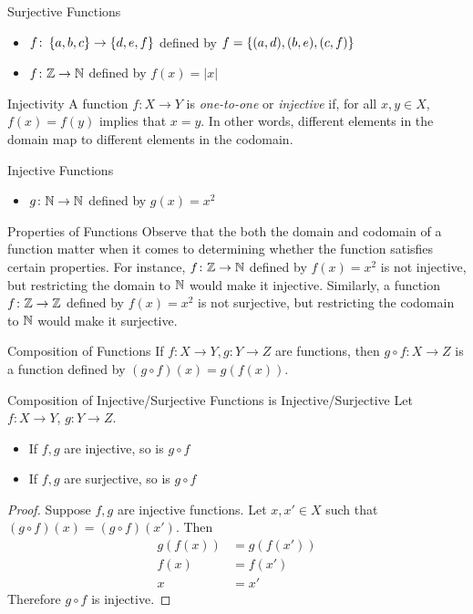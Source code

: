 \documentclass[class=article, crop=false]{standalone}
\begin{document}
  \begin{example}{Surjective Functions}
    \begin{itemize}
      \item $f\colon \left\{a, b, c\right\}\to \left\{d, e, f\right\}$ defined by $f = \left\{(a, d), (b, e), (c, f)\right\}$
      \item $f\colon \mathbb{Z}\to \mathbb{N}$ defined by $f(x) = |x|$
    \end{itemize}
  \end{example}
  \begin{definition}{Injectivity}
    A function $f\colon X\to Y$ is \emph{one-to-one} or \emph{injective} if, for all $x, y\in X$, $f(x) = f(y)$ implies that $x = y$. In other words, different elements in the domain map to different elements in the codomain.
  \end{definition}
  \begin{example}{Injective Functions}
    \begin{itemize}
      \item $g\colon \mathbb{N}\to \mathbb{N}$ defined by $g(x) = x^2$
    \end{itemize}
  \end{example}
  \begin{note}{Properties of Functions}
    Observe that the both the domain and codomain of a function matter when it comes to determining whether the function satisfies certain properties. For instance, $f\colon \mathbb{Z}\to \mathbb{N}$ defined by $f(x) = x^2$ is not injective, but restricting the domain to $\mathbb{N}$ would make it injective. Similarly, a function $f\colon \mathbb{Z}\to \mathbb{Z}$ defined by $f(x) = x^2$ is not surjective, but restricting the codomain to $\mathbb{N}$ would make it surjective.
  \end{note}
  \begin{definition}{Composition of Functions}
    If $f\colon X\to Y, g\colon Y\to Z$ are functions, then $g\circ f\colon X\to Z$ is a function defined by $(g\circ f)(x) = g(f(x))$.
  \end{definition}
  \newpage
  \begin{theorem}{Composition of Injective/Surjective Functions is Injective/Surjective}
    Let $f\colon X\to Y$, $g\colon Y\to Z$.
    \begin{itemize}
      \item If $f, g$ are injective, so is $g\circ f$
      \item If $f, g$ are surjective, so is $g\circ f$
    \end{itemize}
  \end{theorem}
  \begin{proof}
    Suppose $f, g$ are injective functions. Let $x, x' \in X$ such that $(g\circ f)(x) = (g\circ f)(x')$. Then
    \begin{align*}
      g(f(x)) &= g(f(x')) \\
      f(x) &= f(x') \tag{Because $g$ is injective} \\
      x &= x' \tag{Because $f$ is injective}
    \end{align*}
    Therefore $g\circ f$ is injective.
  \end{proof}
\end{document}
